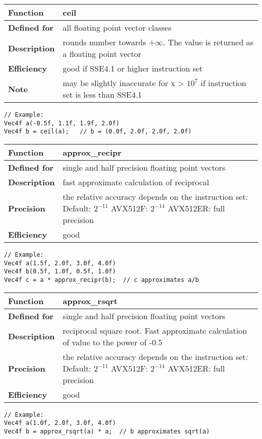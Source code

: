\documentclass[vcl_manual.tex]{subfiles}
\begin{document}
\begin{tabular}{|p{25mm}|p{100mm}|}
\hline
\bfseries Function & ceil \\ \hline
\bfseries Defined for & all floating point vector classes \\ \hline
\bfseries Description & rounds number towards $+\infty$. The value is returned as a floating point vector \\ \hline
\bfseries Efficiency & good if SSE4.1 or higher instruction set \\ \hline
\bfseries Note & may be slightly inaccurate for x \textgreater{} $10^7$ if instruction set is less than SSE4.1 \\ \hline
\end{tabular}
\begin{lstlisting}[frame=none]
// Example:
Vec4f a(-0.5f, 1.1f, 1.9f, 2.0f)
Vec4f b = ceil(a);   // b = (0.0f, 2.0f, 2.0f, 2.0f)
\end{lstlisting}


\begin{tabular}{|p{25mm}|p{100mm}|}
\hline
\bfseries Function & approx\_recipr \\ \hline
\bfseries Defined for & single and half precision floating point vectors \\ \hline
\bfseries Description & fast approximate calculation of reciprocal  \\ \hline
\bfseries Precision & the relative accuracy depends on the instruction set:\newline
Default: $2^{-11}$\newline
AVX512F: $2^{-14}$\newline
AVX512ER: full precision \\ \hline
\bfseries Efficiency & good \\ \hline
\end{tabular}
\begin{lstlisting}[frame=none]
// Example:
Vec4f a(1.5f, 2.0f, 3.0f, 4.0f)
Vec4f b(0.5f, 1.0f, 0.5f, 1.0f)
Vec4f c = a * approx_recipr(b);  // c approximates a/b
\end{lstlisting}


\begin{tabular}{|p{25mm}|p{100mm}|}
\hline
\bfseries Function & approx\_rsqrt \\ \hline
\bfseries Defined for & single and half precision floating point vectors \\ \hline
\bfseries Description & reciprocal square root. Fast approximate calculation of value to the power of -0.5 \\ \hline
\bfseries Precision & the relative accuracy depends on the instruction set:\newline
Default: $2^{-11}$\newline
AVX512F: $2^{-14}$\newline
AVX512ER: full precision \\ \hline
\bfseries Efficiency & good \\ \hline
\end{tabular}
\begin{lstlisting}[frame=none]
// Example:
Vec4f a(1.0f, 2.0f, 3.0f, 4.0f)
Vec4f b = approx_rsqrt(a) * a;  // b approximates sqrt(a)
\end{lstlisting}
\end{document}
